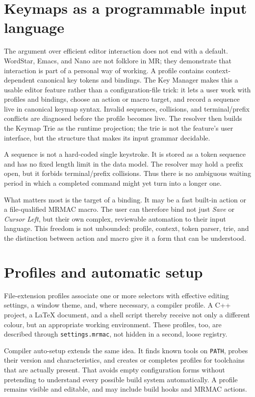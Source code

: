 \documentclass[a4paper,10pt,twoside,openany]{book}
\newcommand{\mr}{\textsc{MR}}
\newcommand{\mrmac}{\textsc{MRMAC}}
\begin{document}
\chapter{Keymaps as a programmable input language}

The argument over efficient editor interaction does not end with a default.
WordStar, Emacs, and Nano are not folklore in \mr{}; they demonstrate that
interaction is part of a personal way of working. A profile contains
context-dependent canonical key tokens and bindings. The Key Manager makes
this a usable editor feature rather than a configuration-file trick: it lets a
user work with profiles and bindings, choose an action or macro target, and
record a sequence live in canonical keymap syntax. Invalid sequences,
collisions, and terminal/prefix conflicts are diagnosed before the profile
becomes live. The resolver then builds the Keymap Trie as the runtime
projection; the trie is not the feature's user interface, but the structure
that makes its input grammar decidable.

A sequence is not a hard-coded single keystroke. It is stored as a token
sequence and has no fixed length limit in the data model. The resolver may
hold a prefix open, but it forbids terminal/prefix collisions. Thus there is
no ambiguous waiting period in which a completed command might yet turn into a
longer one.

What matters most is the target of a binding. It may be a fast built-in action
or a file-qualified \mrmac{} macro. The user can therefore bind not just
\emph{Save} or \emph{Cursor Left}, but their own complex, reviewable automation
to their input language. This freedom is not unbounded: profile, context,
token parser, trie, and the distinction between action and macro give it a
form that can be understood.

\chapter{Profiles and automatic setup}

File-extension profiles associate one or more selectors with effective editing
settings, a window theme, and, where necessary, a compiler profile. A C++
project, a \LaTeX{} document, and a shell script thereby receive not only a
different colour, but an appropriate working environment. These profiles, too,
are described through \texttt{settings.mrmac}, not hidden in a second, loose
registry.

Compiler auto-setup extends the same idea. It finds known tools on
\texttt{PATH}, probes their version and characteristics, and creates or
completes profiles for toolchains that are actually present. That avoids empty
configuration forms without pretending to understand every possible build
system automatically. A profile remains visible and editable, and may include
build hooks and MRMAC actions.
\end{document}
